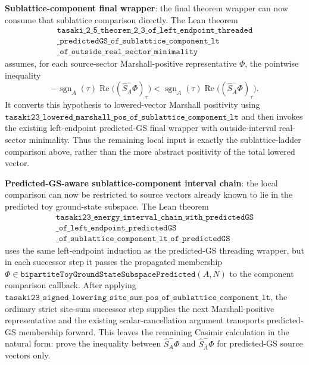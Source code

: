 \documentclass[a4paper,11pt]{article}
\begin{document}
\textbf{Sublattice-component final wrapper}: the final theorem wrapper can
now consume that sublattice comparison directly.  The Lean theorem
\[
\begin{gathered}
\texttt{tasaki\_2\_5\_theorem\_2\_3\_of\_left\_endpoint\_threaded}\\
\texttt{\_predictedGS\_of\_sublattice\_component\_lt}\\
\texttt{\_of\_outside\_real\_sector\_minimality}
\end{gathered}
\]
assumes, for each source-sector Marshall-positive representative \(\Phi\),
the pointwise inequality
\[
  -\operatorname{sgn}_A(\tau)
    \operatorname{Re}\bigl((\hat S_A^-\Phi)_\tau\bigr)
  <
  \operatorname{sgn}_A(\tau)
    \operatorname{Re}\bigl((\hat S_{\bar A}^-\Phi)_\tau\bigr).
\]
It converts this hypothesis to lowered-vector Marshall positivity using
\(\texttt{tasaki23\_lowered\_marshall\_pos\_of\_sublattice\_component\_lt}\)
and then invokes the existing left-endpoint predicted-GS final wrapper with
outside-interval real-sector minimality.  Thus the remaining local input is
exactly the sublattice-ladder comparison above, rather than the more
abstract positivity of the total lowered vector.

\textbf{Predicted-GS-aware sublattice-component interval chain}: the local
comparison can now be restricted to source vectors already known to lie in
the predicted toy ground-state subspace.  The Lean theorem
\[
\begin{gathered}
\texttt{tasaki23\_energy\_interval\_chain\_with\_predictedGS}\\
\texttt{\_of\_left\_endpoint\_predictedGS}\\
\texttt{\_of\_sublattice\_component\_lt\_of\_predictedGS}
\end{gathered}
\]
uses the same left-endpoint induction as the predicted-GS threading
wrapper, but in each successor step it passes the propagated membership
\(\Phi\in\texttt{bipartiteToyGroundStateSubspacePredicted}(A,N)\)
to the component comparison callback.  After applying
\(\texttt{tasaki23\_signed\_lowering\_site\_sum\_pos\_of\_sublattice\_component\_lt}\),
the ordinary strict site-sum successor step supplies the next
Marshall-positive representative and the existing scalar-cancellation
argument transports predicted-GS membership forward.  This leaves the
remaining Casimir calculation in the natural form: prove the inequality
between \(\hat S_A^-\Phi\) and \(\hat S_{\bar A}^-\Phi\) for predicted-GS
source vectors only.
\end{document}
